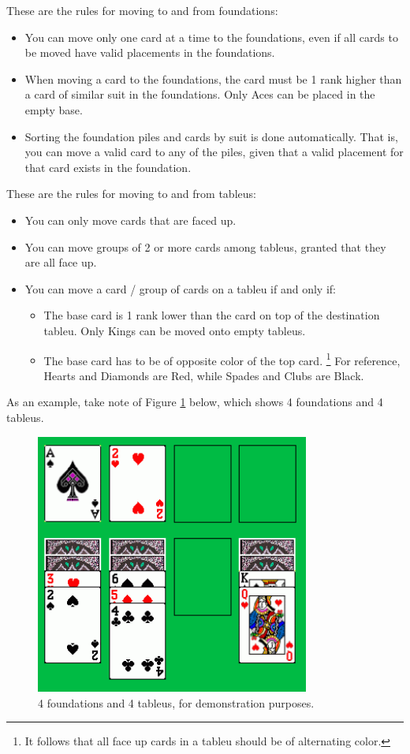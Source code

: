\documentclass[12pt,a4paper,titlepage]{article}
\begin{document}
	These are the rules for moving to and from foundations:
	\begin{itemize}
		\item You can move only one card at a time to the foundations, even if
		all cards to be moved have valid placements in the foundations.
		\item When moving a card to the foundations, the card must be 1 rank
		higher than a card of similar suit in the foundations. Only Aces can
		be placed in the empty base.
		\item Sorting the foundation piles and cards by suit is done
		automatically. That is, you can move a valid card to any of the piles,
		given that a valid placement for that card exists in the foundation.
	\end{itemize}

	These are the rules for moving to and from tableus:
	\begin{itemize}
		\item You can only move cards that are faced up.
		\item You can move groups of 2 or more cards among tableus, granted that
		they are all face up.
		\item You can move a card / group of cards on a tableu if and only if:
		\begin{itemize}
			\item The base card is 1 rank lower than the card on top of the
			destination tableu. Only Kings can be moved onto empty tableus.
			\item The base card has to be of opposite color of the top card.
			\footnote{It follows that all face up cards in a tableu should be of
			alternating color.} For reference, Hearts and Diamonds are Red,
			while Spades and Clubs are Black.
		\end{itemize}
	\end{itemize}

	As an example, take note of Figure \ref{fig:fig3} below, which shows 4
	foundations and 4 tableus.

	\begin{figure}[H]
		\centering
		\captionsetup{justification=centering}
		\includegraphics[width=9cm]{images/fig3.png}
		\caption{4 foundations and 4 tableus, for demonstration purposes.}
		\label{fig:fig3}
	\end{figure}
\end{document}
